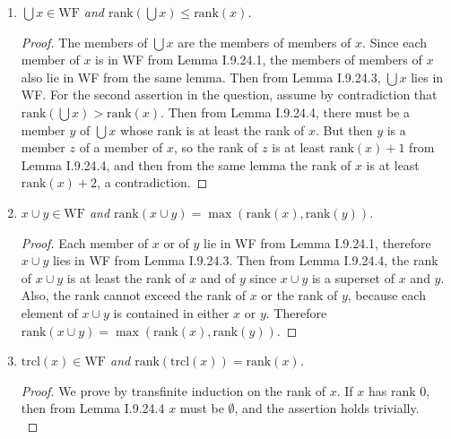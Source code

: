 \documentclass{article}
\begin{document}
\begin{enumerate}
    \item \it $\bigcup x\in\text{WF}$ and $\text{rank}(\bigcup x)
      \leq\text{rank}(x)$.

      \begin{proof}
        The members of $\bigcup x$ are the members of members of $x$. Since
        each member of $x$ is in WF from Lemma I.9.24.1, the members of
        members of $x$ also lie in WF from the same lemma. Then from Lemma
        I.9.24.3, $\bigcup x$ lies in WF. For the second assertion in the
        question, assume by contradiction that $\text{rank}(\bigcup
        x)>\text{rank}(x)$. Then from Lemma I.9.24.4, there must be a
        member $y$ of $\bigcup x$ whose rank is at least the rank of $x$. But
        then $y$ is a member $z$ of a member of $x$, so the rank of $z$ is
        at least $\text{rank}(x)+1$ from Lemma I.9.24.4, and then from the
        same lemma the rank of $x$ is at least $\text{rank}(x)+2$, a
        contradiction.
      \end{proof}

    \item \it $x\cup y\in\text{WF}$ and $\text{rank}(x\cup y)
      =\max(\text{rank}(x), \text{rank}(y))$.

      \begin{proof}
        Each member of $x$ or of $y$ lie in WF from Lemma I.9.24.1,
        therefore $x\cup y$ lies in WF from Lemma I.9.24.3. Then from Lemma
        I.9.24.4, the rank of $x\cup y$ is at least the rank of $x$ and of
        $y$ since $x\cup y$ is a superset of $x$ and $y$. Also, the rank
        cannot exceed the rank of $x$ or the rank of $y$, because each
        element of $x\cup y$ is contained in either $x$ or $y$. Therefore
        $\text{rank}(x\cup y) =\max(\text{rank}(x), \text{rank}(y))$.
      \end{proof}

    \item \it $\text{trcl}(x)\in\text{WF}$ and $\text{rank}(\text{trcl}(x))
      =\text{rank}(x)$.

      \begin{proof}
        We prove by transfinite induction on the rank of $x$. If $x$ has
        rank 0, then from Lemma I.9.24.4 $x$ must be $\emptyset$, and the
        assertion holds trivially. \\


\end{proof}
\end{enumerate}
\end{document}
